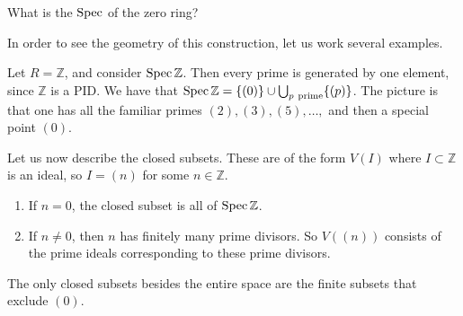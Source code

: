\begin{exercise} 
What is the $\operatorname{Spec}$ of the zero ring?
\end{exercise} 

In order to see the geometry of this construction, let us work
several examples.

\begin{example} 
Let $R = \mathbb{Z}$, and consider $\operatorname{Spec} \mathbb{Z}$. Then
every prime is generated by one element, since
$\mathbb{Z}$ is a PID. We have that $\operatorname{Spec} \mathbb{Z} = \{(0)\}
\cup \bigcup_{p \
\mathrm{prime}} \{ (p)\}$. The picture is that one has all the
familiar primes $(2), (3),
(5), \dots, $ and then a special point $(0)$.

Let us now describe the closed subsets. These are of the form
$V(I)$ where $I
\subset \mathbb{Z}$ is an ideal, so $I = (n)$ for some $n \in
\mathbb{Z}$.

\begin{enumerate}
\item If $n=0$, the closed subset is all of $\operatorname{Spec} \mathbb{Z}$.
\item If $n \neq 0$, then $n$ has finitely many prime divisors.
So $V((n))$ consists
of the prime ideals corresponding to these prime divisors.  
\end{enumerate}

The only closed subsets besides the entire space are the finite
subsets
that exclude $(0)$.  
\end{example} 

